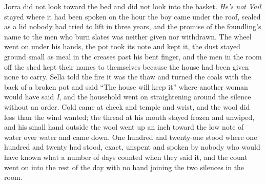 Jorra did not look toward the bed and did not look into the basket. \emph{He's not Vail} stayed where it had been spoken on the hour the boy came under the roof, sealed as a lid nobody had tried to lift in three years, and the promise of the foundling's name to the men who burn slates was neither given nor withdrawn. The wheel went on under his hands, the pot took its note and kept it, the dust stayed ground small as meal in the creases past his bent finger, and the men in the room off the shed kept their names to themselves because the house had been given none to carry. Sella told the fire it was the thaw and turned the coals with the back of a broken pot and said “The house will keep it” where another woman would have said \emph{I}, and the household went on straightening around the silence without an order. Cold came at cheek and temple and wrist, and the wool did less than the wind wanted; the thread at his mouth stayed frozen and unwiped, and his small hand outside the wool went up an inch toward the low note of water over water and came down. One hundred and twenty-one stood where one hundred and twenty had stood, exact, unspent and spoken by nobody who would have known what a number of days counted when they said it, and the count went on into the rest of the day with no hand joining the two silences in the room.
